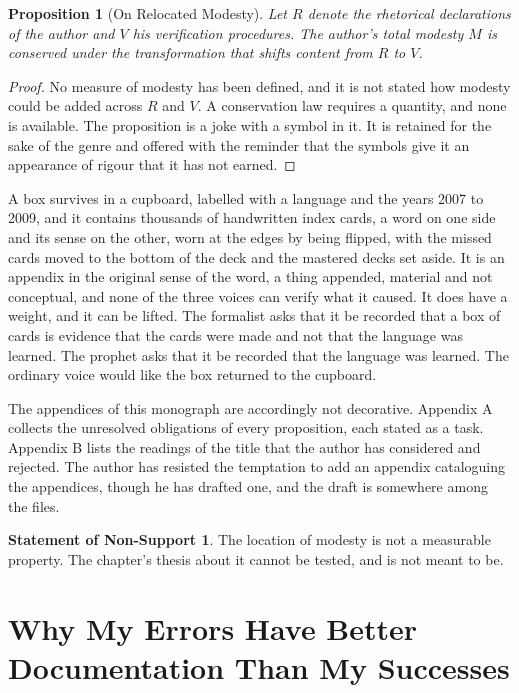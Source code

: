 \documentclass[11pt,openany,twoside]{book}
\theoremstyle{plain}
\newtheorem{proposition}{Proposition}[chapter]
\theoremstyle{definition}
\newtheorem{nonsupport}{Statement of Non-Support}
\theoremstyle{remark}
\begin{document}
\begin{proposition}[On Relocated Modesty]\label{prop:modesty}
Let $R$ denote the rhetorical declarations of the author and $V$ his verification procedures. The author's total modesty $M$ is conserved under the transformation that shifts content from $R$ to $V$.
\end{proposition}

\begin{proof}
No measure of modesty has been defined, and it is not stated how modesty could be added across $R$ and $V$. A conservation law requires a quantity, and none is available. The proposition is a joke with a symbol in it. It is retained for the sake of the genre and offered with the reminder that the symbols give it an appearance of rigour that it has not earned.
\end{proof}

A box survives in a cupboard, labelled with a language and the years 2007 to 2009, and it contains thousands of handwritten index cards, a word on one side and its sense on the other, worn at the edges by being flipped, with the missed cards moved to the bottom of the deck and the mastered decks set aside. It is an appendix in the original sense of the word, a thing appended, material and not conceptual, and none of the three voices can verify what it caused. It does have a weight, and it can be lifted. The formalist asks that it be recorded that a box of cards is evidence that the cards were made and not that the language was learned. The prophet asks that it be recorded that the language was learned. The ordinary voice would like the box returned to the cupboard.

The appendices of this monograph are accordingly not decorative. Appendix A collects the unresolved obligations of every proposition, each stated as a task. Appendix B lists the readings of the title that the author has considered and rejected. The author has resisted the temptation to add an appendix cataloguing the appendices, though he has drafted one, and the draft is somewhere among the files.

\begin{nonsupport}
The location of modesty is not a measurable property. The chapter's thesis about it cannot be tested, and is not meant to be.
\end{nonsupport}

\chapter{Why My Errors Have Better Documentation Than My Successes}
\end{document}
